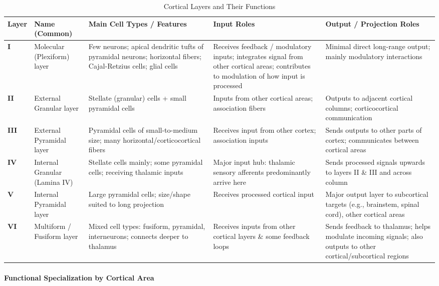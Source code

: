 \begin{table}[h!]
\centering
\scriptsize
\begin{tabular}{|p{0.8cm}|p{2.5cm}|p{3cm}|p{3cm}|p{3.5cm}|}
\hline
\textbf{Layer} & \textbf{Name (Common)} & \textbf{Main Cell Types / Features} & \textbf{Input Roles} & \textbf{Output / Projection Roles} \\
\hline
\textbf{I} & Molecular (Plexiform) layer & Few neurons; apical dendritic tufts of pyramidal neurons; horizontal fibers; Cajal-Retzius cells; glial cells & Receives feedback / modulatory inputs; integrates signal from other cortical areas; contributes to modulation of how input is processed & Minimal direct long-range output; mainly modulatory interactions \\
\hline
\textbf{II} & External Granular layer & Stellate (granular) cells + small pyramidal cells & Inputs from other cortical areas; association fibers & Outputs to adjacent cortical columns; corticocortical communication \\
\hline
\textbf{III} & External Pyramidal layer & Pyramidal cells of small-to-medium size; many horizontal/corticocortical fibers & Receives input from other cortex; association inputs & Sends outputs to other parts of cortex; communicates between cortical areas \\
\hline
\textbf{IV} & Internal Granular (Lamina IV) & Stellate cells mainly; some pyramidal cells; receiving thalamic inputs & Major input hub: thalamic sensory afferents predominantly arrive here & Sends processed signals upwards to layers II \& III and across column \\
\hline
\textbf{V} & Internal Pyramidal layer & Large pyramidal cells; size/shape suited to long projection & Receives processed cortical input & Major output layer to subcortical targets (e.g., brainstem, spinal cord), other cortical areas \\
\hline
\textbf{VI} & Multiform / Fusiform layer & Mixed cell types: fusiform, pyramidal, interneurons; connects deeper to thalamus & Receives inputs from other cortical layers \& some feedback loops & Sends feedback to thalamus; helps modulate incoming signals; also outputs to other cortical/subcortical regions \\
\hline
\end{tabular}
\caption{Cortical Layers and Their Functions}
\label{tab:cortical-layers}
\end{table}

\paragraph{Functional Specialization by Cortical Area}
\label{para:functional-specialization}

